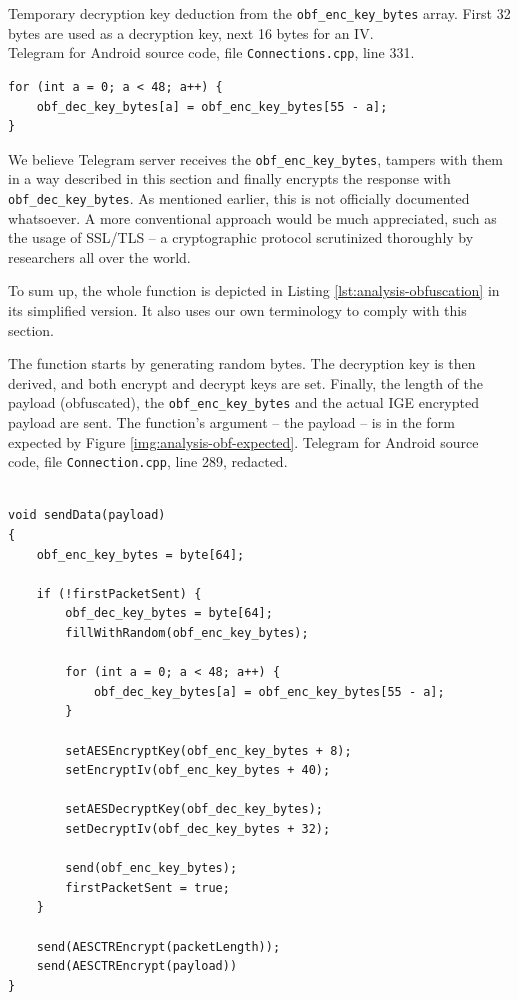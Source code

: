\documentclass[thesis=M,english]{FITthesis}[2012/10/20]
\begin{document}
\begin{listing}[htb]
\caption{Temporary decryption key deduction from the \texttt{obf\_enc\_key\_bytes} array. First 32 bytes are used as a decryption key, next 16 bytes for an IV.
\protect \\ Telegram for Android source code, file \texttt{Connections.cpp}, line 331.}
\label{lst:code-obf-dec}
\begin{verbatim}
for (int a = 0; a < 48; a++) {
    obf_dec_key_bytes[a] = obf_enc_key_bytes[55 - a];
}
\end{verbatim}
\end{listing}


We believe Telegram server receives the \texttt{obf\_enc\_key\_bytes}, tampers with them in a way described in this section and finally encrypts the response with \texttt{obf\_dec\_key\_bytes}. As mentioned earlier, this is not officially documented whatsoever. A more conventional approach would be much appreciated,  such as the usage of SSL/TLS -- a cryptographic protocol scrutinized thoroughly by researchers all over the world.

To sum up, the whole function is depicted in Listing \ref{lst:analysis-obfuscation} in its simplified version. It also uses our own terminology to comply with this section.

\begin{listing}[htb]
\caption{The function starts by generating random bytes. The decryption key is then derived, and both encrypt and decrypt keys are set. Finally, the length of the payload (obfuscated), the \texttt{obf\_enc\_key\_bytes} and the actual IGE encrypted payload are sent. The function's argument -- the payload -- is in the form expected by Figure \ref{img:analysis-obf-expected}.
\protect\linebreak Telegram for Android source code, file \texttt{Connection.cpp}, line 289, redacted.}
\label{lst:analysis-obfuscation}
\begin{verbatim}

void sendData(payload)
{
    obf_enc_key_bytes = byte[64];

    if (!firstPacketSent) {
        obf_dec_key_bytes = byte[64];
        fillWithRandom(obf_enc_key_bytes);

        for (int a = 0; a < 48; a++) {
            obf_dec_key_bytes[a] = obf_enc_key_bytes[55 - a];
        }

        setAESEncryptKey(obf_enc_key_bytes + 8);
        setEncryptIv(obf_enc_key_bytes + 40);

        setAESDecryptKey(obf_dec_key_bytes);
        setDecryptIv(obf_dec_key_bytes + 32);
        
        send(obf_enc_key_bytes);
        firstPacketSent = true;
    }

    send(AESCTREncrypt(packetLength));
    send(AESCTREncrypt(payload))
}
\end{verbatim}
\end{listing}
\end{document}
